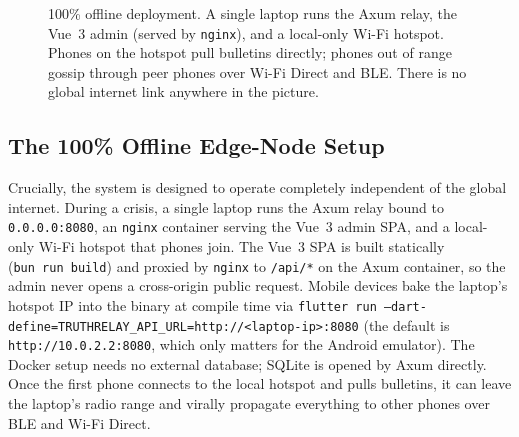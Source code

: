 \documentclass[11pt,a4paper]{article}
\begin{document}
\begin{figure}[t]
  \caption{100\% offline deployment. A single laptop runs the Axum
           relay, the Vue~3 admin (served by \texttt{nginx}), and a
           local-only Wi-Fi hotspot. Phones on the hotspot pull
           bulletins directly; phones out of range gossip through
           peer phones over Wi-Fi Direct and BLE. There is no global
           internet link anywhere in the picture.}
  \label{fig:overview}
\end{figure}

\subsection{The 100\% Offline Edge-Node Setup}
\label{sec:offline-edge-node}

Crucially, the system is designed to operate completely independent of the global internet. During a crisis, a single laptop runs the Axum relay bound to \texttt{0.0.0.0:8080}, an \texttt{nginx} container serving the Vue~3 admin SPA, and a local-only Wi-Fi hotspot that phones join. The Vue~3 SPA is built statically (\texttt{bun\ run\ build}) and proxied by \texttt{nginx} to \texttt{/api/*} on the Axum container, so the admin never opens a cross-origin public request. Mobile devices bake the laptop's hotspot IP into the binary at compile time via \texttt{flutter\ run\ --dart-define=TRUTHRELAY\_API\_URL=http://<laptop-ip>:8080} (the default is \texttt{http://10.0.2.2:8080}, which only matters for the Android emulator). The Docker setup needs no external database; SQLite is opened by Axum directly. Once the first phone connects to the local hotspot and pulls bulletins, it can leave the laptop's radio range and virally propagate everything to other phones over BLE and Wi-Fi Direct.
\end{document}
